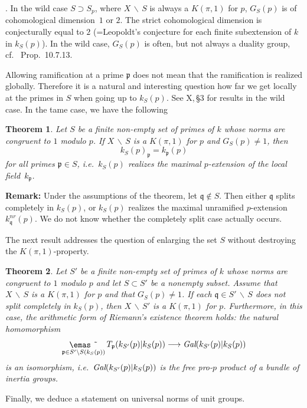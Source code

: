 \documentclass[10pt]{article}
\newcommand{\p}{{\mathfrak p}}
\newcommand{\q}{{\mathfrak q}}
\newcommand{\sm}{{\,\smallsetminus\,}}
\newcommand{\Gal}{\text{\it Gal}}
\newcommand{\freeproductmed}{\mathop{\lower.2mm\hbox{\emas \symbol{3}}}\limits}
\newcommand{\nr}{\mathit{nr}}
\theoremstyle{alex}
\newtheorem{itheorem}{Theorem}
\theoremstyle{alexdef}
\begin{document}
\smallskip{}. In the wild case $S\supset S_p$, where $X\sm S$ is always a $K(\pi,1)$ for $p$, $G_S(p)$ is of cohomological dimension~$1$ or $2$.  The strict cohomological dimension is conjecturally equal to $2$ (=Leopoldt's conjecture for each finite subextension of $k$ in $k_S(p)$). In the wild case, $G_S(p)$ is often, but not always a duality group, cf.\ \cite{NSW} Prop.\ 10.7.13.



\bigskip
Allowing ramification at a prime $\p$ does not mean that the ramification is realized globally.
Therefore it is a natural and interesting question how far we get locally at the primes in $S$ when going up to $k_S(p)$.  See \cite{NSW} X,\,\S 3 for results in the wild case. In the tame case, we have the following
\begin{itheorem} \label{1.2} Let $S$ be a finite non-empty set of primes of\/ $k$ whose norms are congruent to\/ $1$ modulo $p$.  If\/ $X\sm S$ is a $K(\pi,1)$ for\/  $p$ and $G_S(p)\neq 1$, then
\[
k_S(p)_\p=k_\p(p)
\]
for all primes $\p\in S$, i.e.\ $k_S(p)$ realizes the maximal $p$-extension of the local field~$k_\p$.
\end{itheorem}

\noindent
{\bf Remark:} Under the assumptions of the theorem, let $\q\notin S$. Then either $\q$ splits completely in $k_S(p)$, or $k_S(p)$ realizes the maximal unramified $p$-extension $k_\q^\nr(p)$. We do not know whether the completely split case actually occurs.

\bigskip
The next result addresses the question of enlarging the set $S$ without destroying the $K(\pi,1)$-property.

\begin{itheorem} \label{1.3} Let $S'$ be a finite non-empty set of primes of $k$ whose norms are congruent to $1$ modulo $p$ and let $S\subset S'$ be a nonempty subset. Assume that $X\sm S$ is a $K(\pi,1)$ for $p$ and that $G_S(p)\neq 1$. If each $\q\in S'\sm S$ does not split completely in $k_S(p)$, then $X\sm S'$ is a $K(\pi,1)$ for $p$. Furthermore, in this case, the arithmetic form of Riemann's existence theorem holds:  the natural homomorphism
\[
\freeproductmed_{{\mathfrak p} \in S'\backslash S(k_S(p))} T_\p(k_{S'}(p)|k_S(p)) \longrightarrow \Gal(k_{S'}(p)|k_S(p))
\]
is an isomorphism, i.e.\ $\Gal(k_{S'}(p)|k_S(p))$ is the free pro-$p$ product of a bundle of inertia groups.
\end{itheorem}

Finally, we deduce a statement on universal norms of unit groups.
\end{document}
